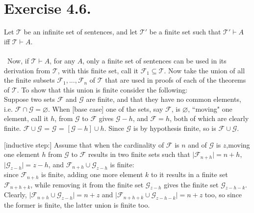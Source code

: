 \documentclass{article}
\begin{document}
\section*{Exercise 4.6.}
Let $\mathcal{T}$ be an infinite set of sentences, and let $\mathcal{T'}$ be a finite set such that $\mathcal{T'}\vdash A$ iff $\mathcal{T}\vdash A$.\\\\\
Now, if $\mathcal{T}\vdash A$, for any $A$, only a finite set of sentences can be used in its derivation from $\mathcal{T}$, with this finite set, call it $\mathcal{F}_1 \subseteq \mathcal{T}$. Now take the union of all the finite subsets $\mathcal{F}_1, ..., \mathcal{F}_n$ of $\mathcal{T}$ that are used in proofs of each of the theorems of $\mathcal{T}$. To show that this union is finite consider the following:\\

Suppose two sets $\mathcal{F}$ and $\mathcal{G}$ are finite, and that they have no common elements, i.e. $\mathcal{F} \cap \mathcal{G}= \varnothing$. When [base case] one of the sets, say $\mathcal{F}$, is $\varnothing$, ``moving" one element, call it $h$, from $\mathcal{G}$ to $\mathcal{F}$ gives $\mathcal{G} - h$, and $\mathcal{F} = h$, both of which are clearly finite. $\mathcal{F} \cup \mathcal{G}$ = $\mathcal{G}$ = $[\mathcal{G} - h] \cup h$. Since $\mathcal{G}$ is by hypothesis finite, so is $\mathcal{F} \cup \mathcal{G}$.

[inductive step:] Assume that when the cardinality of $\mathcal{F}$ is $n$ and of $\mathcal{G}$ is $z$,moving one element $h$ from $\mathcal{G}$ to $\mathcal{F}$ results in two finite sets such that $\mid\mathcal{F}_{n+h}\mid = n+h$, $\mid\mathcal{G}_{z-h}\mid = z-h$, and $\mathcal{F}_{n+h} \cup \mathcal{G}_{z-h}$ is finite:\\ since $\mathcal{F}_{n+h}$ is finite, adding one more element $k$ to it results in a finite set $\mathcal{F}_{n+h+k}$, while removing it from the finite set $\mathcal{G}_{z-h}$ gives the finite set $\mathcal{G}_{z-h-k}$.\\
Clearly, $\mid\mathcal{F}_{n+h} \cup \mathcal{G}_{z-h}\mid = n+z$ and $\mid\mathcal{F}_{n+h+k} \cup \mathcal{G}_{z-h-k}\mid = n+z$ too, so since the former is finite, the latter union is finite too.\\
\end{document}
